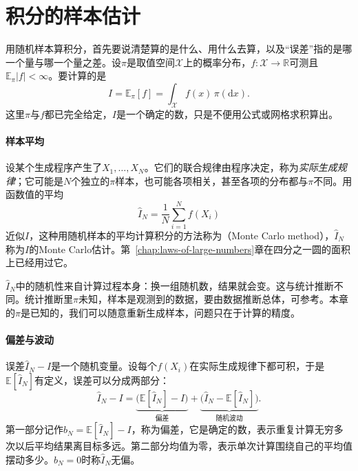 \section{积分的样本估计}
\label{sec:mcerr-estimator}

用随机样本算积分，首先要说清楚算的是什么、用什么去算，以及“误差”指的是哪一个量与哪一个量之差。设$\pi$是取值空间$\mathcal{X}$上的概率分布，$f\colon\mathcal{X}\to\mathbb{R}$可测且$\mathbb{E}_{\pi}\lvert f\rvert<\infty$。要计算的是
\begin{equation}
 I=\mathbb{E}_{\pi}[f]=\int_{\mathcal{X}}f(x)\,\pi(\mathrm{d}x) .
 \label{eq:mcerr-target}
\end{equation}
这里$\pi$与$f$都已完全给定，$I$是一个确定的数，只是不便用公式或网格求积算出。

\paragraph{样本平均}
设某个生成程序产生了$X_1,\dots,X_N$。它们的联合规律由程序决定，称为\emph{实际生成规律}；它可能是$N$个独立的$\pi$样本，也可能各项相关，甚至各项的分布都与$\pi$不同。用函数值的平均
\begin{equation}
 \hat{I}_N=\frac{1}{N}\sum_{i=1}^{N}f(X_i)
 \label{eq:mcerr-estimator}
\end{equation}
近似$I$，这种用随机样本的平均计算积分的方法称为（Monte Carlo method），$\hat{I}_N$称为$I$的Monte Carlo估计。第~\ref{chap:laws-of-large-numbers}章在四分之一圆的面积上已经用过它。

$\hat{I}_N$中的随机性来自计算过程本身：换一组随机数，结果就会变。这与统计推断不同。统计推断里$\pi$未知，样本是观测到的数据，要由数据推断总体，可参考。本章的$\pi$是已知的，我们可以随意重新生成样本，问题只在于计算的精度。

\paragraph{偏差与波动}
误差$\hat{I}_N-I$是一个随机变量。设每个$f(X_i)$在实际生成规律下都可积，于是$\mathbb{E}[\hat{I}_N]$有定义，误差可以分成两部分：
\begin{equation}
 \hat{I}_N-I=\underbrace{\bigl(\mathbb{E}[\hat{I}_N]-I\bigr)}_{\text{偏差}}+\underbrace{\bigl(\hat{I}_N-\mathbb{E}[\hat{I}_N]\bigr)}_{\text{随机波动}} .
 \label{eq:mcerr-split}
\end{equation}
第一部分记作$b_N=\mathbb{E}[\hat{I}_N]-I$，称为偏差，它是确定的数，表示重复计算无穷多次以后平均结果离目标多远。第二部分均值为零，表示单次计算围绕自己的平均值摆动多少。$b_N=0$时称$\hat{I}_N$无偏。

